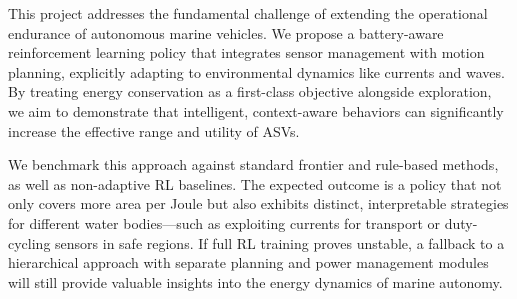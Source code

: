 This project addresses the fundamental challenge of extending the operational endurance of autonomous marine vehicles. We propose a battery-aware reinforcement learning policy that integrates sensor management with motion planning, explicitly adapting to environmental dynamics like currents and waves. By treating energy conservation as a first-class objective alongside exploration, we aim to demonstrate that intelligent, context-aware behaviors can significantly increase the effective range and utility of ASVs.

We benchmark this approach against standard frontier and rule-based methods, as well as non-adaptive RL baselines. The expected outcome is a policy that not only covers more area per Joule but also exhibits distinct, interpretable strategies for different water bodies—such as exploiting currents for transport or duty-cycling sensors in safe regions. If full RL training proves unstable, a fallback to a hierarchical approach with separate planning and power management modules will still provide valuable insights into the energy dynamics of marine autonomy.
